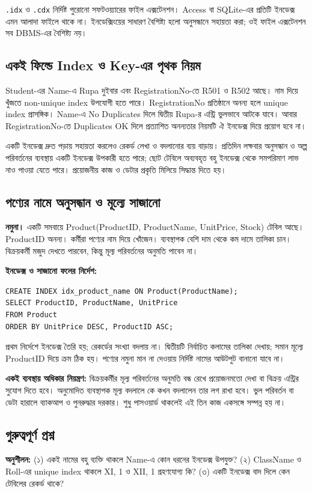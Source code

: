 \texttt{.idx} ও \texttt{.cdx} নির্দিষ্ট পুরোনো সফটওয়্যারের ফাইল এক্সটেনশন। Access বা SQLite-এর প্রতিটি ইনডেক্স এমন আলাদা ফাইলে থাকে না। ইনডেক্সিংয়ের সাধারণ বৈশিষ্ট্য হলো অনুসন্ধানে সহায়তা করা; ওই ফাইল এক্সটেনশন সব DBMS-এর বৈশিষ্ট্য নয়।

\subsection{একই ফিল্ডে Index ও Key-এর পৃথক নিয়ম}
Student-এর Name-এ Rupa দুইবার এবং RegistrationNo-তে R501 ও R502 আছে। নাম দিয়ে খুঁজতে non-unique index উপযোগী হতে পারে। RegistrationNo প্রতিষ্ঠানে অনন্য হলে unique index প্রাসঙ্গিক। Name-এ No Duplicates দিলে দ্বিতীয় Rupa-র এন্ট্রি ভুলভাবে আটকে যাবে। আবার RegistrationNo-তে Duplicates OK দিলে প্রত্যাশিত অনন্যতার নিয়মটি ঐ ইনডেক্স দিয়ে প্রয়োগ হবে না।

একটি ইনডেক্স দ্রুত পড়ায় সহায়তা করলেও রেকর্ড লেখা ও বদলানোর ব্যয় বাড়ায়। প্রতিদিন লক্ষবার অনুসন্ধান ও অল্প পরিবর্তনের ব্যবস্থায় একটি ইনডেক্স উপকারী হতে পারে; ছোট টেবিলে অব্যবহৃত বহু ইনডেক্স থেকে সমপরিমাণ লাভ নাও পাওয়া যেতে পারে। প্রয়োজনীয় কাজ ও ডেটার প্রকৃতি মিলিয়ে সিদ্ধান্ত দিতে হয়।

\subsection{পণ্যের নামে অনুসন্ধান ও মূল্যে সাজানো}
\textbf{নমুনা।} একটি সমবায়ে Product(ProductID, ProductName, UnitPrice, Stock) টেবিল আছে। ProductID অনন্য। কর্মীরা পণ্যের নাম দিয়ে খোঁজেন। ব্যবস্থাপক বেশি দাম থেকে কম দামে তালিকা চান। বিক্রয়কর্মী মজুদ দেখতে পারবেন, কিন্তু মূল্য পরিবর্তনের অনুমতি পাবেন না।

\textbf{ইনডেক্স ও সাজানো ফলের নির্দেশ:}
\begin{verbatim}
CREATE INDEX idx_product_name ON Product(ProductName);
SELECT ProductID, ProductName, UnitPrice
FROM Product
ORDER BY UnitPrice DESC, ProductID ASC;
\end{verbatim}
প্রথম নির্দেশে ইনডেক্স তৈরি হয়; রেকর্ডের সংখ্যা বদলায় না। দ্বিতীয়টি নির্বাচিত কলামের তালিকা দেখায়; সমান মূল্যে ProductID দিয়ে ক্রম ঠিক হয়। পণ্যের নমুনা মান না দেওয়ায় নির্দিষ্ট নামের আউটপুট বানানো যাবে না।

\textbf{একই ব্যবস্থায় অধিকার নিয়ন্ত্রণ:} বিক্রয়কর্মীর মূল্য পরিবর্তনের অনুমতি বন্ধ রেখে প্রয়োজনমতো দেখা বা বিক্রয় এন্ট্রির সুযোগ দিতে হবে। অনুমোদিত ব্যবস্থাপক মূল্য বদলালে কে কখন বদলালেন তার লগ রাখা হবে। ভুল পরিবর্তন বা ডেটা হারালে ব্যাকআপ ও পুনরুদ্ধার দরকার। শুধু পাসওয়ার্ড থাকলেই এই তিন কাজ একসঙ্গে সম্পন্ন হয় না।

\subsection{গুরুত্বপূর্ণ প্রশ্ন}
\textbf{অনুশীলন:} (১) একই নামের বহু ব্যক্তি থাকলে Name-এ কোন ধরনের ইনডেক্স উপযুক্ত? (২) ClassName ও Roll-এর unique index থাকলে XI, 1 ও XII, 1 গ্রহণযোগ্য কি? (৩) একটি ইনডেক্স বাদ দিলে কেন টেবিলের রেকর্ড থাকে?\par



